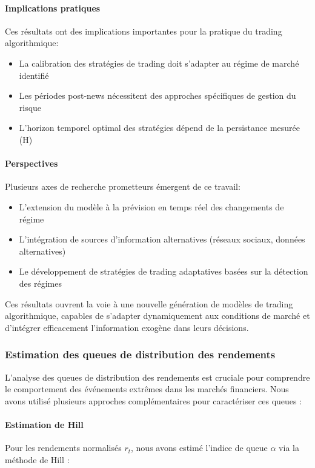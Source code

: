 \documentclass[12pt,a4paper]{article}
\theoremstyle{definition}
\theoremstyle{remark}
\begin{document}
\paragraph{\textbf{Implications pratiques}} Ces résultats ont des implications importantes pour la pratique du trading algorithmique:
\begin{itemize}
    \item La calibration des stratégies de trading doit s'adapter au régime de marché identifié
    \item Les périodes post-news nécessitent des approches spécifiques de gestion du risque
    \item L'horizon temporel optimal des stratégies dépend de la persistance mesurée (H)
\end{itemize}

\paragraph{\textbf{Perspectives}} Plusieurs axes de recherche prometteurs émergent de ce travail:
\begin{itemize}
    \item L'extension du modèle à la prévision en temps réel des changements de régime
    \item L'intégration de sources d'information alternatives (réseaux sociaux, données alternatives)
    \item Le développement de stratégies de trading adaptatives basées sur la détection des régimes
\end{itemize}

Ces résultats ouvrent la voie à une nouvelle génération de modèles de trading algorithmique, capables de s'adapter dynamiquement aux conditions de marché et d'intégrer efficacement l'information exogène dans leurs décisions.

\subsubsection{Estimation des queues de distribution des rendements}

L'analyse des queues de distribution des rendements est cruciale pour comprendre le comportement des événements extrêmes dans les marchés financiers. Nous avons utilisé plusieurs approches complémentaires pour caractériser ces queues :

\paragraph{Estimation de Hill}
Pour les rendements normalisés $r_t$, nous avons estimé l'indice de queue $\alpha$ via la méthode de Hill :
\end{document}
